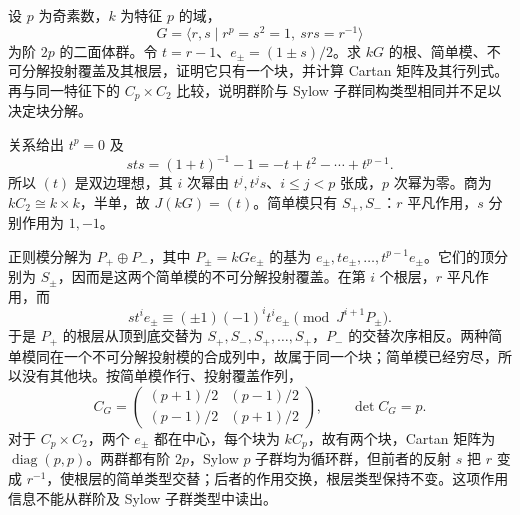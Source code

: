 \begin{optionalexercise}\label{b5:ex:08-s3-three-cartan}
	设 \(p\) 为奇素数，\(k\) 为特征 \(p\) 的域，
	\[
		G=\langle r,s\mid r^p=s^2=1,\ srs=r^{-1}\rangle
	\]
	为阶 \(2p\) 的二面体群。令 \(t=r-1\)、\(e_\pm=(1\pm s)/2\)。求 \(kG\) 的根、简单模、不可分解投射覆盖及其根层，证明它只有一个块，并计算 Cartan 矩阵及其行列式。再与同一特征下的 \(C_p\times C_2\) 比较，说明群阶与 Sylow 子群同构类型相同并不足以决定块分解。
\end{optionalexercise}
\begin{solution}
	关系给出 \(t^p=0\) 及
	\[
		sts=(1+t)^{-1}-1=-t+t^2-\cdots+t^{p-1}.
	\]
	所以 \((t)\) 是双边理想，其 \(i\) 次幂由 \(t^j,t^js\)、\(i\le j<p\) 张成，\(p\) 次幂为零。商为 \(kC_2\cong k\times k\)，半单，故 \(J(kG)=(t)\)。简单模只有 \(S_+,S_-\)：\(r\) 平凡作用，\(s\) 分别作用为 \(1,-1\)。

	正则模分解为 \(P_+\oplus P_-\)，其中 \(P_\pm=kGe_\pm\) 的基为 \(e_\pm,te_\pm,\ldots,t^{p-1}e_\pm\)。它们的顶分别为 \(S_\pm\)，因而是这两个简单模的不可分解投射覆盖。在第 \(i\) 个根层，\(r\) 平凡作用，而
	\[
		s t^ie_\pm\equiv(\pm1)(-1)^it^ie_\pm
		\pmod{J^{i+1}P_\pm}.
	\]
	于是 \(P_+\) 的根层从顶到底交替为 \(S_+,S_-,S_+,\ldots,S_+\)，\(P_-\) 的交替次序相反。两种简单模同在一个不可分解投射模的合成列中，故属于同一个块；简单模已经穷尽，所以没有其他块。按简单模作行、投射覆盖作列，
	\[
		C_G=\begin{pmatrix}(p+1)/2&(p-1)/2\\(p-1)/2&(p+1)/2\end{pmatrix},
		\qquad \det C_G=p.
	\]
	对于 \(C_p\times C_2\)，两个 \(e_\pm\) 都在中心，每个块为 \(kC_p\)，故有两个块，Cartan 矩阵为 \(\operatorname{diag}(p,p)\)。两群都有阶 \(2p\)，Sylow \(p\) 子群均为循环群，但前者的反射 \(s\) 把 \(r\) 变成 \(r^{-1}\)，使根层的简单类型交替；后者的作用交换，根层类型保持不变。这项作用信息不能从群阶及 Sylow 子群类型中读出。
\end{solution}


